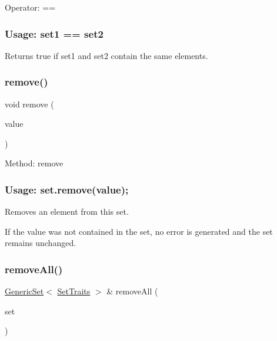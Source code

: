 Operator\+: == \subsubsection*{Usage\+: set1 == set2 }

Returns {\ttfamily true} if {\ttfamily set1} and {\ttfamily set2} contain the same elements. 

\mbox{\label{classstanfordcpplib_1_1collections_1_1GenericSet_ab522af639e5f45b032943bc611de79db}} 
\subsubsection{\texorpdfstring{remove()}{remove()}}
{\footnotesize\ttfamily void remove (\begin{DoxyParamCaption}\item[{const \mbox{\hyperlink{classstanfordcpplib_1_1collections_1_1GenericSet_a669c81f158766925e7293f97c0099b28}{value\+\_\+type}} \&}]{value }\end{DoxyParamCaption})}



Method\+: remove \subsubsection*{Usage\+: set.\+remove(value); }

Removes an element from this set. 

If the value was not contained in the set, no error is generated and the set remains unchanged. \mbox{\label{classstanfordcpplib_1_1collections_1_1GenericSet_a59fc29f868cd2ce2668788198e8a05a7}} 
\subsubsection{\texorpdfstring{remove\+All()}{removeAll()}}
{\footnotesize\ttfamily \mbox{\hyperlink{classstanfordcpplib_1_1collections_1_1GenericSet}{Generic\+Set}}$<$ \mbox{\hyperlink{structstanfordcpplib_1_1collections_1_1SetTraits}{Set\+Traits}} $>$ \& remove\+All (\begin{DoxyParamCaption}\item[{const \mbox{\hyperlink{classstanfordcpplib_1_1collections_1_1GenericSet}{Generic\+Set}}$<$ \mbox{\hyperlink{structstanfordcpplib_1_1collections_1_1SetTraits}{Set\+Traits}} $>$ \&}]{set }\end{DoxyParamCaption})}




